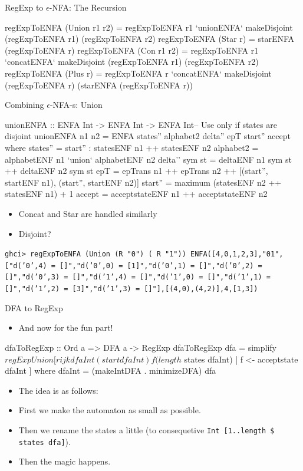 \begin{frame}[fragile]{RegExp to $\epsilon$-NFA: The Recursion}
	\begin{code}
regExpToENFA (Union r1 r2) = regExpToENFA r1 `unionENFA` makeDisjoint (regExpToENFA r1) (regExpToENFA r2)
regExpToENFA (Star r) = starENFA (regExpToENFA r)
regExpToENFA (Con r1 r2) = regExpToENFA r1 `concatENFA` makeDisjoint (regExpToENFA r1) (regExpToENFA r2)
regExpToENFA (Plus r) = regExpToENFA r `concatENFA` makeDisjoint (regExpToENFA r) (starENFA (regExpToENFA r))
	\end{code}
\end{frame}
\begin{frame}[fragile]{Combining $\epsilon$-NFA-s: Union}
	\begin{code}
unionENFA :: ENFA Int -> ENFA Int -> ENFA Int-- Use only if states are disjoint
unionENFA n1 n2 = ENFA states'' alphabet2 delta'' epT start'' accept where
	states'' = start'' : statesENF n1 ++ statesENF n2
	alphabet2 = alphabetENF n1 `union` alphabetENF n2
	delta'' sym st = deltaENF n1 sym st ++ deltaENF n2 sym st
	epT = epTrans n1 ++ epTrans n2 ++ [(start'', startENF n1), (start'', startENF n2)]
	start'' = maximum (statesENF n2 ++ statesENF n1) + 1 
	accept = acceptstateENF n1 ++ acceptstateENF n2
	\end{code}
\pause	
\begin{itemize}
	\item Concat and Star are handled similarly
	\item Disjoint? 
\end{itemize}	
\texttt{ghci> regExpToENFA (Union (R "0") ( R "1"))
	ENFA([4,0,1,2,3],"01",["d('0',4) = []","d('0',0) = [1]","d('0',1) = []","d('0',2) = []","d('0',3) = []","d('1',4) = []","d('1',0) = []","d('1',1) = []","d('1',2) = [3]","d('1',3) = []"],[(4,0),(4,2)],4,[1,3])}
\end{frame}
\begin{frame}[fragile]{DFA to RegExp}
	\begin{itemize}
		\item<1> And now for the fun part!
	\end{itemize}
\pause	
	\begin{code}		
dfaToRegExp :: Ord a => DFA a -> RegExp
dfaToRegExp dfa = simplify $ regExpUnion [rijk dfaInt (start dfaInt) f (length $ states dfaInt) | f <- acceptstate dfaInt ]
	where dfaInt = (makeIntDFA . minimizeDFA) dfa
	\end{code}
\pause	
	\begin{itemize}
		\item The idea is as follows: 
		\item First we make the automaton as small as possible.\pause
		\item Then we rename the states a little (to consequetive \texttt{Int [1..length \$ states dfa]}).\pause
		\item Then the magic happens.
	\end{itemize}	
\end{frame}
